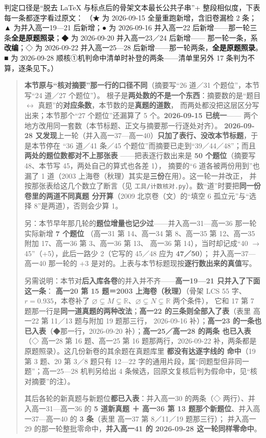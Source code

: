 \documentclass[a4paper,11pt]{article}
\begin{document}
判定口径是``脱去 LaTeX 与标点后的骨架文本最长公共子串''+ 整段相似度，下表每一条都逐字看过原文：
（★ 为 2026-09-15 全量重跑新增，含旧卷漏检 2 条；▲ 为并入高一19---21 后新增；● 为 2026-09-16
并入高一22 后新增------那一轮三条\textbf{全是原题照录}；◆ 为 2026-09-20 并入高一23／24 后新增------
那一轮一条，系\textbf{改编}；◇ 为 2026-09-22 并入高一25---28 后新增------那一轮两条，\textbf{全是原题照录}。
\textbf{■} 为 2026-09-28 顺核①机判命中清单时补登的两条------清单里另外 17 条判为不算，逐条见下。）

\begin{quote}
\textbf{本节原与``核对摘要''那一行的口径不同}（摘要写``26 道／31 个题位''，本节写``24 道／27 个题位''）。
根子是\textbf{两处数的不是一个东西}：摘要数的是``题目 $\leftrightarrow$ 真题''的\textbf{对应条数}，本节数的是\textbf{真题的道数}，
而两处都没把这层区分写出来；本节那个``27 个题位''还漏算了 5 个。\textbf{2026-09-15 已统一}------
两个地方改用同一套数（本节标题、正文与摘要那一行逐处对齐）。
\textbf{2026-09-28 又发现}上一轮（并入高一37---高一40）\textbf{只加了表行、没改本节标题}，于是本节停在
``36 道／41 条／45 个题位''而摘要已走到``39／44／48''；而且\textbf{两处的题位数都对不上那张表}
------把表逐行数出来是 \textbf{50 个题位}（摘要写 48、本节写 45，两处自己的算式也各差 1），
摘要的``6 道各被两份用到''也漏了 1 道（2003 上海卷（秋理）其实是\textbf{三份}在用）。这一轮一并改正，
并按那张表给这几个数立了断言（见 \texttt{工具/\allowbreak{}计数核对.py}）。数``道''时要把\textbf{同一份卷里的两道不同真题
分开算}（2009 北京卷（文）的``填空 6 孤立元''与``选择 8''是两道），否则会少算 1。

另：本节早年那几轮的\textbf{题位增量也记少过}------并入高一31---高一36 那一轮实际新增 \textbf{7 个题位}
（高一31 第 14、高一34 第 8、高一35 第 12、高一35 附加 17、高一36 第 3、高一36 第 13、
高一36 第 14），当时却记成``40 $\to$ 45''（+5），此后一路少 2（它写的 45／48 应为 \textbf{47／50}）；
并入高一37---高一40 那一轮的 +3 是对的。上表与本节标题现按\textbf{逐行数出来的真值}写。

另需说明：本节对\textbf{后入库各卷}的并入并不齐------\textbf{高一19---21 只并入了下面这一条}：
\textbf{高一20 第 15 题＝2003 上海卷（秋理）}（骨架 LCS 55 字、\(r=0.935\)，本卷补了
\(\varnothing\subsetneq M\subsetneq\mathbb R\)、\(\varnothing\subsetneq N\subsetneq\mathbb R\) 两个条件），
它和 17 第 7 题那一行是\textbf{同一道真题的两种改法}；\textbf{高一22 的三条则全部入了表}（表里 高一22 第 11／13 题与附加 19 题那三行，
2026-09-16 补）；\textbf{高一23 的一条也已入表}（◆那一行，2026-09-20 补）；\textbf{高一25／高一28 的两条
也已入表}（◇ 高一28 第 16 题、高一25 第 16 题那两行，2026-09-22 补，两条都是原题照录）。这几份新卷的其余题在真题库里
\textbf{都没有达逐字线的
命中}（19 第 3 题、20 第 3／8 题只有 12---22 字的通用片段，属``同题型但非同一题''；高一25---28
机判另给出 4 条候选，回原文复核后判为假命中，见``核对摘要''的注）。

其后各轮的新真题与新题位\textbf{都已入表}：并入高一30 的两条（◇ 两行）、并入高一31---高一36 的
\textbf{5 道新真题 ＋ 高一36 第 13 题那个新题位}、并入高一37---高一40 的 \textbf{3 条}（表里 高一37 第 8／11／19 题那三行）；
并入高一29 的那一轮整批零命中，\textbf{并入高一41 的 2026-09-28 这一轮同样零命中}。
\end{quote}
\end{document}
